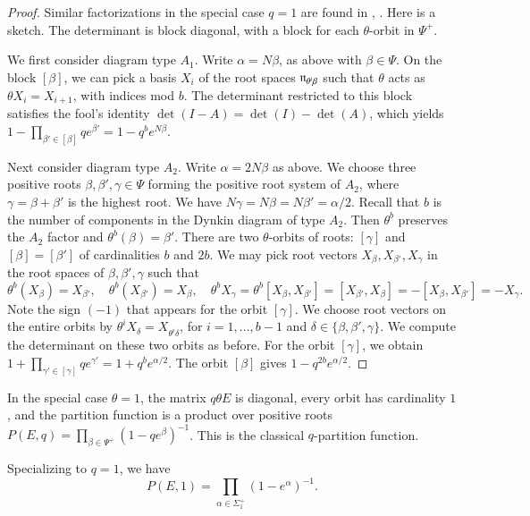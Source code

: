 \begin{proof} Similar factorizations in the special case $q=1$
are found in \cite{jantzen1977darstellungen}, \cite{wendt2001weyl}.  Here is a sketch.
The determinant is block diagonal, with a block for each $\theta$-orbit in $\Psi^+$.

We first consider diagram type $A_1$.
Write $\alpha = N\beta$, as above with $\beta\in\Psi$.
On the block $[\beta]$, we can pick a basis $X_i$ of the
root spaces ${\mathfrak n}_{\theta^i\beta}$ such that $\theta$ acts as $\theta X_i = X_{i+1}$, with indices mod $b$.
The determinant restricted  to this block satisfies the fool's identity $\det(I-A) = \det(I)-\det(A)$, which yields
$1- \prod_{\beta'\in [\beta]} {q e^{\beta'}} = 1- q^b e^{N \beta}$.

Next consider diagram type $A_2$.  Write $\alpha = 2N\beta$ as above.
We choose three positive roots
$\beta,\beta',\gamma\in\Psi$ forming the positive root system of $A_2$, where $\gamma=\beta+\beta'$ is 
the highest root.  
We have $N\gamma=N\beta=N\beta'=\alpha/2$.
Recall that $b$ is the number of components in the Dynkin diagram of type $A_2$.
Then $\theta^b$ preserves the $A_2$ factor and $\theta^b(\beta)=\beta'$.
There are two $\theta$-orbits of roots: $[\gamma]$ and $[\beta]=[\beta']$ of cardinalities $b$ and $2b$.
We may pick root vectors $X_{\beta},X_{\beta'},X_{\gamma}$ in the root spaces of $\beta,\beta',\gamma$ such that 
\[
\theta^b(X_\beta)= X_{\beta'},\quad \theta^b(X_{\beta'})=X_\beta,\quad
\theta^b X_\gamma = \theta^b [X_\beta,X_{\beta'}] = [X_{\beta'},X_\beta] = -[X_\beta,X_{\beta'}] = -X_\gamma.
\]
Note the sign $(-1)$ that appears for the orbit $[\gamma]$.
We choose root vectors on the entire orbits by $\theta^i X_\delta=X_{\theta^i \delta}$, for $i=1,\ldots,b-1$ and
$\delta\in\{\beta,\beta',\gamma\}$.
We compute the determinant on these two orbits as before.  
For the orbit $[\gamma]$, we obtain
 $1+\prod_{\gamma'\in [\gamma]} {q e^{\gamma'}} = 1+ q^b e^{\alpha/2}$.
The orbit $[\beta]$ gives $1-q^{2b} e^{\alpha/2}$.
\end{proof}


In the special case $\theta=1$, the matrix $q \theta E$ is diagonal, every orbit has cardinality $1$,
and the partition function
is a product over positive roots 
$P(E,q) = \prod_{\beta\in\Psi^+} (1- q e^\beta)^{-1}$.  This is the classical $q$-partition function.


\begin{corollary}\label{cor:prod1} Specializing to $q=1$, we have
\[
P(E,1) = \prod_{\alpha\in\Sigma^+_1} (1-e^{\alpha})^{-1}.
\]
\end{corollary}

